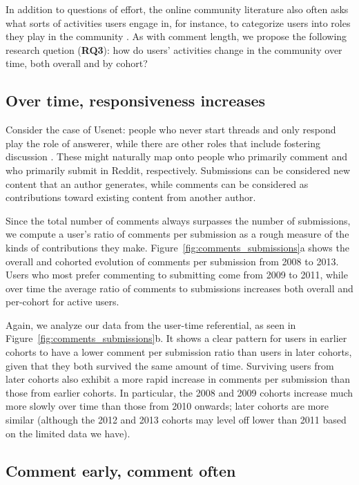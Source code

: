 \documentclass[10pt, oneside, onecolumn]{article}
\begin{document}
In addition to questions of effort, the online community literature also often asks what sorts of activities users engage in, for instance, to categorize users into roles they play in the community \cite{Welser2011}. As with comment length, we propose the following research quetion (\textbf{RQ3}): how do users' activities change in the community over time, both overall and by cohort?

\subsection{Over time, responsiveness increases}
Consider the case of Usenet: people who never start threads and only respond play the role of answerer, while there are other roles that include fostering discussion \cite{Welser2007}.  These might naturally map onto people who primarily comment and who primarily submit in Reddit, respectively.  Submissions can be considered new content that an author generates, while comments can be considered as contributions toward existing content from another author.

Since the total number of comments always surpasses the number of submissions, we compute a user's ratio of comments per submission as a rough measure of the kinds of contributions they make.  Figure~\ref{fig:comments_submissions}a shows the overall and cohorted evolution of comments per submission from 2008 to 2013.  Users who most prefer commenting to submitting come from 2009 to 2011, while over time the average ratio of comments to submissions increases both overall and per-cohort for active users.

Again, we analyze our data from the user-time referential, as seen in Figure~\ref{fig:comments_submissions}b. It shows a clear pattern for users in earlier cohorts to have a lower comment per submission ratio than users in later cohorts, given that they both survived the same amount of time.  Surviving users from later cohorts also exhibit a more rapid increase in comments per submission than those from earlier cohorts.  In particular, the 2008 and 2009 cohorts increase much more slowly over time than those from 2010 onwards; later cohorts are more similar (although the 2012 and 2013 cohorts may level off lower than 2011 based on the limited data we have). 

\subsection{Comment early, comment often}
\end{document}
